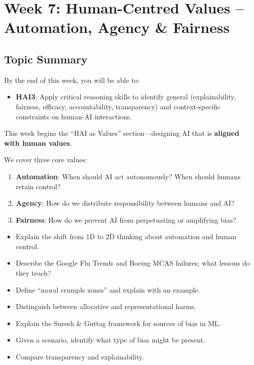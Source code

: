 \section{Week 7: Human-Centred Values -- Automation, Agency \& Fairness}

\subsection{Topic Summary}

\begin{keybox}
By the end of this week, you will be able to:
\begin{itemize}
  \item \textbf{HAI3}: Apply critical reasoning skills to identify general (explainability, fairness, efficacy, accountability, transparency) and context-specific constraints on human-AI interactions.
\end{itemize}
\end{keybox}

\begin{keybox}
This week begins the ``HAI as Values'' section---designing AI that is \textbf{aligned with human values}.

We cover three core values:
\begin{enumerate}
  \item \textbf{Automation}: When should AI act autonomously? When should humans retain control?
  \item \textbf{Agency}: How do we distribute responsibility between humans and AI?
  \item \textbf{Fairness}: How do we prevent AI from perpetuating or amplifying bias?
\end{enumerate}
\end{keybox}

\begin{keybox}
\begin{itemize}
  \item Explain the shift from 1D to 2D thinking about automation and human control.
  \item Describe the Google Flu Trends and Boeing MCAS failures; what lessons do they teach?
  \item Define ``moral crumple zones'' and explain with an example.
  \item Distinguish between allocative and representational harms.
  \item Explain the Suresh \& Guttag framework for sources of bias in ML.
  \item Given a scenario, identify what type of bias might be present.
  \item Compare transparency and explainability.
\end{itemize}
\end{keybox}

